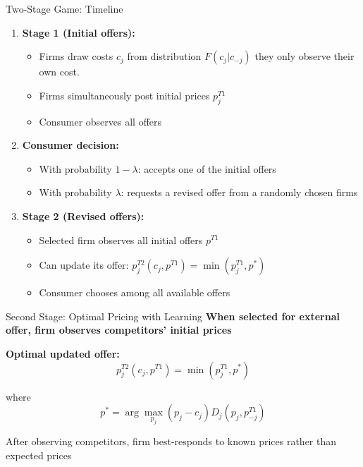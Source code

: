 \documentclass[10pt,aspectratio=169]{beamer}
\begin{document}

\begin{frame}{Two-Stage Game: Timeline}
\begin{enumerate}
    \item \textbf{Stage 1 (Initial offers):}
    \begin{itemize}
        \item Firms draw costs $c_j$ from distribution $F(c_j|c_{-j})$ they only observe their own cost.
        \item Firms simultaneously post initial prices $p^{T1}_j$
        \item Consumer observes all offers
    \end{itemize}
    
    \vspace{0.3cm}
    
    \item \textbf{Consumer decision:}
    \begin{itemize}
        \item With probability $1-\lambda$: accepts one of the initial offers
        \item With probability $\lambda$: requests a revised offer from a randomly chosen firms
    \end{itemize}
    
    \vspace{0.3cm}
    
    \item \textbf{Stage 2 (Revised offers):}
    \begin{itemize}
        \item Selected firm observes all initial offers $p^{T1}$
        \item Can update its offer: $p^{T2}_j(c_j, p^{T1}) = \min(p^{T1}_j, p^*)$
        \item Consumer chooses among all available offers
    \end{itemize}
\end{enumerate}
\end{frame}


\begin{frame}{Second Stage: Optimal Pricing with Learning}
\textbf{When selected for external offer, firm observes competitors' initial prices}

\vspace{0.3cm}

\textbf{Optimal updated offer:}
$$p^{T2}_j(c_j, p^{T1}) = \min(p^{T1}_j, p^*)$$

where
$$p^* = \arg\max_{p_j} (p_j - c_j) D_j(p_j, p^{T1}_{-j})$$

\vspace{0.3cm}
After observing competitors, firm best-responds to known prices rather than expected prices
\end{frame}
\end{document}
